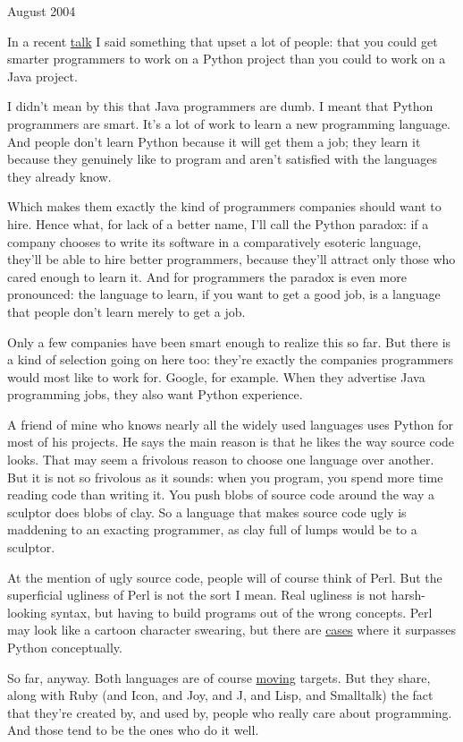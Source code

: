 August 2004

In a recent \href{gh.html}{talk} I said something that upset a lot of
people: that you could get smarter programmers to work on a Python
project than you could to work on a Java project.

I didn't mean by this that Java programmers are dumb. I meant that
Python programmers are smart. It's a lot of work to learn a new
programming language. And people don't learn Python because it will get
them a job; they learn it because they genuinely like to program and
aren't satisfied with the languages they already know.

Which makes them exactly the kind of programmers companies should want
to hire. Hence what, for lack of a better name, I'll call the Python
paradox: if a company chooses to write its software in a comparatively
esoteric language, they'll be able to hire better programmers, because
they'll attract only those who cared enough to learn it. And for
programmers the paradox is even more pronounced: the language to learn,
if you want to get a good job, is a language that people don't learn
merely to get a job.

Only a few companies have been smart enough to realize this so far. But
there is a kind of selection going on here too: they're exactly the
companies programmers would most like to work for. Google, for example.
When they advertise Java programming jobs, they also want Python
experience.

A friend of mine who knows nearly all the widely used languages uses
Python for most of his projects. He says the main reason is that he
likes the way source code looks. That may seem a frivolous reason to
choose one language over another. But it is not so frivolous as it
sounds: when you program, you spend more time reading code than writing
it. You push blobs of source code around the way a sculptor does blobs
of clay. So a language that makes source code ugly is maddening to an
exacting programmer, as clay full of lumps would be to a sculptor.

At the mention of ugly source code, people will of course think of Perl.
But the superficial ugliness of Perl is not the sort I mean. Real
ugliness is not harsh-looking syntax, but having to build programs out
of the wrong concepts. Perl may look like a cartoon character swearing,
but there are \href{icad.html}{cases} where it surpasses Python
conceptually.

So far, anyway. Both languages are of course \href{hundred.html}{moving}
targets. But they share, along with Ruby (and Icon, and Joy, and J, and
Lisp, and Smalltalk) the fact that they're created by, and used by,
people who really care about programming. And those tend to be the ones
who do it well.
